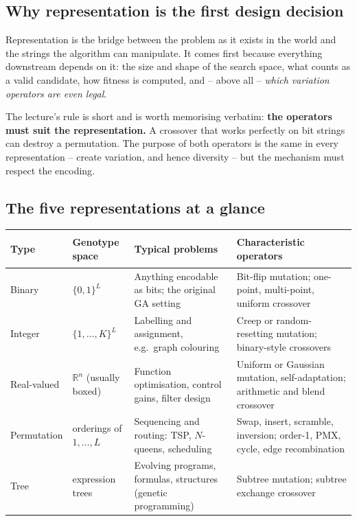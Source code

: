 \documentclass[11pt,a4paper]{article}
\newcommand{\R}{\mathbb{R}}
\begin{document}
\subsection{Why representation is the first design decision}
Representation is the bridge between the problem as it exists in the world
and the strings the algorithm can manipulate. It comes first because
everything downstream depends on it: the size and shape of the search space,
what counts as a valid candidate, how fitness is computed, and -- above all
-- \emph{which variation operators are even legal}.

The lecture's rule is short and is worth memorising verbatim: \textbf{the
operators must suit the representation.} A crossover that works perfectly on
bit strings can destroy a permutation. The purpose of both operators is the
same in every representation -- create variation, and hence diversity -- but
the mechanism must respect the encoding.

\subsection{The five representations at a glance}

\begin{tabular}{@{}>{\bfseries\raggedright\arraybackslash}p{}
  >{\raggedright\arraybackslash}p{}
  >{\raggedright\arraybackslash}p{}
  >{\raggedright\arraybackslash}p{}@{}}
\toprule
Type & Genotype space & Typical problems & Characteristic operators\\
\midrule
Binary & $\{0,1\}^L$ & Anything encodable as bits; the original GA setting & Bit-flip mutation; one-point, multi-point, uniform crossover\\
Integer & $\{1,\ldots,K\}^L$ & Labelling and assignment, e.g.\ graph colouring & Creep or random-resetting mutation; binary-style crossovers\\
Real-valued & $\R^n$ (usually boxed) & Function optimisation, control gains, filter design & Uniform or Gaussian mutation, self-adaptation; arithmetic and blend crossover\\
Permutation & orderings of $1,\ldots,L$ & Sequencing and routing: TSP, $N$-queens, scheduling & Swap, insert, scramble, inversion; order-1, PMX, cycle, edge re\-com\-bi\-na\-tion\\
Tree & expression trees & Evolving programs, formulas, structures (genetic programming) & Subtree mutation; subtree exchange crossover\\
\bottomrule
\end{tabular}
\end{document}
